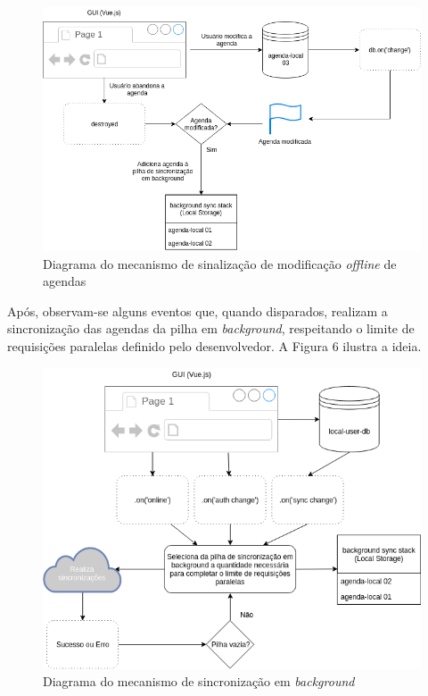 \documentclass[
	article,			%
	11pt,				%
	oneside,			%
	a4paper,			%
	english,			%
	brazil,				%
	sumario=tradicional
	]{abntex2}
\begin{document}
\begin{figure}[H]
	\centering
	\caption{Diagrama do mecanismo de sinalização de modificação \textit{offline} de agendas}
	\includegraphics[width=1\textwidth]{figures/riffnailer-schedule-flags}
\end{figure}

Após, observam-se alguns eventos que, quando disparados, realizam a sincronização das agendas da pilha em \textit{background}, respeitando o limite de requisições paralelas definido pelo desenvolvedor. A Figura 6 ilustra a ideia.

\begin{figure}[H]
	\centering
	\caption{Diagrama do mecanismo de sincronização em \textit{background}}
	\includegraphics[width=1\textwidth]{figures/riffnailer-schedule-flags-sync}
\end{figure}
\end{document}
